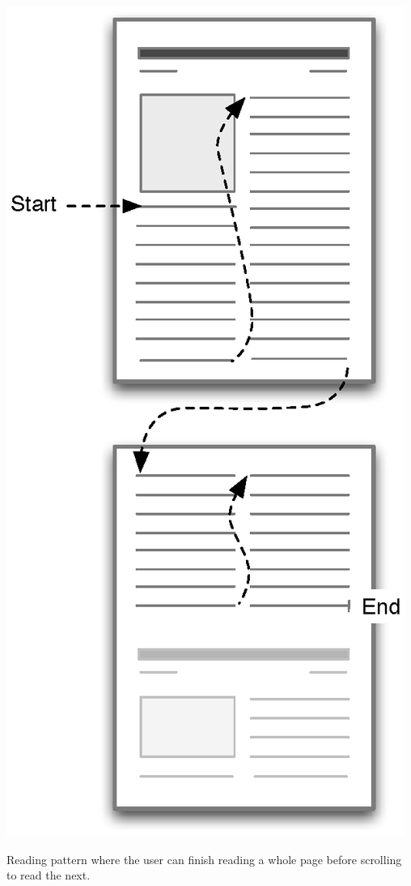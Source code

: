 
\begin{sidefigure}%
\centering%
\includegraphics[width=\marginparwidth]{img/reading2} 
\caption{Reading pattern where the user can finish reading a whole page before scrolling to read the next.}%
\label{fig:reading2}%
\end{sidefigure}

